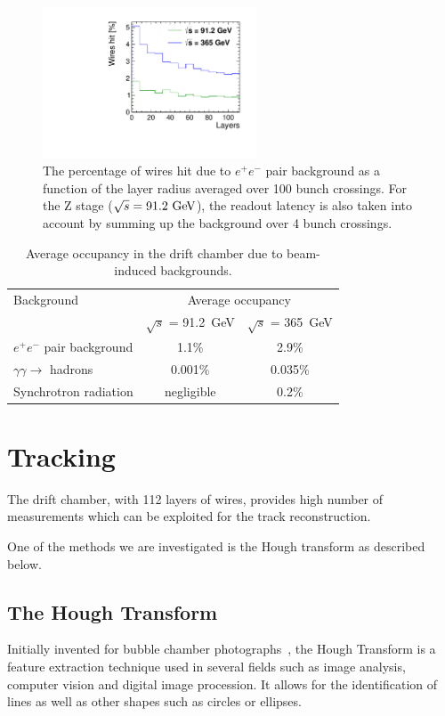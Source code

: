 \documentclass{cernatsnote}
\begin{document}
\begin{figure}[!h]
\centering
\includegraphics[width=2.5in]{figures/incoherent_top_Z.pdf}
\caption{The percentage of wires hit due to $e^+e^-$ pair background as a function of the layer radius averaged over 100 bunch crossings. For the Z stage ($\sqrt{s} = 91.2\,\mathrm{\,Ge\kern -0.1em V}$), the readout latency is also taken into account by summing up the background over 4 bunch crossings.}
\label{fig_simhitspercent}
\end{figure}

\begin{table}[!h]
	\renewcommand{\arraystretch}{1.3}
	\caption{Average occupancy in the drift chamber due to beam-induced backgrounds.}
	\label{occupancy_DCH}
	\centering
	\begin{tabular}{l c c}
		\toprule
		 Background & \multicolumn{2}{c}{Average occupancy} \\
			& $\sqrt{s}$ = 91.2~GeV & $\sqrt{s}$ = 365~GeV \\
		 \midrule
		 $e^+e^-$ pair background & 1.1\% & 2.9\% \\
		 $\gamma\gamma\rightarrow$ hadrons & 0.001\% & 0.035\%  \\
		 Synchrotron radiation & negligible & 0.2\% \\
		 \bottomrule
	\end{tabular}
\end{table}



\section{Tracking}

The drift chamber, with 112 layers of wires, provides high number of measurements which can be exploited for the track reconstruction.

One of the methods we are investigated is the Hough transform as described below.

\subsection{The Hough Transform}
Initially invented for bubble chamber photographs~\cite{HTWikipedia}, the Hough Transform is a feature extraction technique used in several fields such as image analysis, computer vision and digital image procession. It allows for the identification of lines as well as other shapes such as circles or ellipses.
\end{document}
